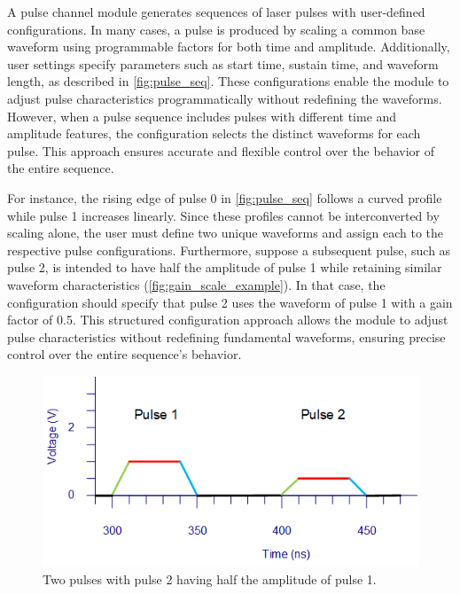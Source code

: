 
A pulse channel module generates sequences of laser pulses with user-defined configurations. In many cases, a pulse is produced by scaling a common base waveform using programmable factors for both time and amplitude. Additionally, user settings specify parameters such as start time, sustain time, and waveform length, as described in \autoref{fig:pulse_seq}. These configurations enable the module to adjust pulse characteristics programmatically without redefining the waveforms. However, when a pulse sequence includes pulses with different time and amplitude features, the configuration selects the distinct waveforms for each pulse. This approach ensures accurate and flexible control over the behavior of the entire sequence. 

For instance, the rising edge of pulse 0 in \autoref{fig:pulse_seq} follows a curved profile while pulse 1 increases linearly. Since these profiles cannot be interconverted by scaling alone, the user must define two unique waveforms and assign each to the respective pulse configurations. Furthermore, suppose a subsequent pulse, such as pulse 2, is intended to have half the amplitude of pulse 1 while retaining similar waveform characteristics (\autoref{fig:gain_scale_example}). In that case, the configuration should specify that pulse 2 uses the waveform of pulse 1 with a gain factor of 0.5. This structured configuration approach allows the module to adjust pulse characteristics without redefining fundamental waveforms, ensuring precise control over the entire sequence's behavior.

\begin{figure}[h]
    \centering
    \includegraphics[width=0.7\linewidth]{figures/3.1.1.png}
    \caption{Two pulses with pulse 2 having half the amplitude of pulse 1.}
    \label{fig:gain_scale_example}
\end{figure}

